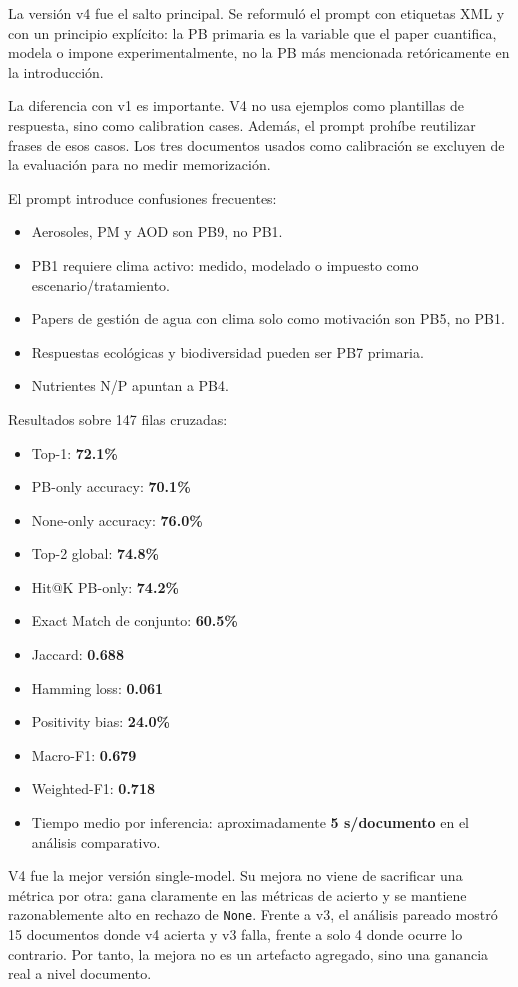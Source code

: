 La versión v4 fue el salto principal. Se reformuló el prompt con etiquetas XML y con un principio explícito: la PB primaria es la variable que el paper cuantifica, modela o impone experimentalmente, no la PB más mencionada retóricamente en la introducción.

La diferencia con v1 es importante. V4 no usa ejemplos como plantillas de respuesta, sino como calibration cases. Además, el prompt prohíbe reutilizar frases de esos casos. Los tres documentos usados como calibración se excluyen de la evaluación para no medir memorización.

El prompt introduce confusiones frecuentes:

\begin{itemize}
\item Aerosoles, PM y AOD son PB9, no PB1.
\item PB1 requiere clima activo: medido, modelado o impuesto como escenario/tratamiento.
\item Papers de gestión de agua con clima solo como motivación son PB5, no PB1.
\item Respuestas ecológicas y biodiversidad pueden ser PB7 primaria.
\item Nutrientes N/P apuntan a PB4.
\end{itemize}

Resultados sobre 147 filas cruzadas:

\begin{itemize}
\item Top-1: \textbf{72.1\%}
\item PB-only accuracy: \textbf{70.1\%}
\item None-only accuracy: \textbf{76.0\%}
\item Top-2 global: \textbf{74.8\%}
\item Hit@K PB-only: \textbf{74.2\%}
\item Exact Match de conjunto: \textbf{60.5\%}
\item Jaccard: \textbf{0.688}
\item Hamming loss: \textbf{0.061}
\item Positivity bias: \textbf{24.0\%}
\item Macro-F1: \textbf{0.679}
\item Weighted-F1: \textbf{0.718}
\item Tiempo medio por inferencia: aproximadamente \textbf{5 s/documento} en el análisis comparativo.
\end{itemize}

V4 fue la mejor versión single-model. Su mejora no viene de sacrificar una métrica por otra: gana claramente en las métricas de acierto y se mantiene razonablemente alto en rechazo de \texttt{None}. Frente a v3, el análisis pareado mostró 15 documentos donde v4 acierta y v3 falla, frente a solo 4 donde ocurre lo contrario. Por tanto, la mejora no es un artefacto agregado, sino una ganancia real a nivel documento.

